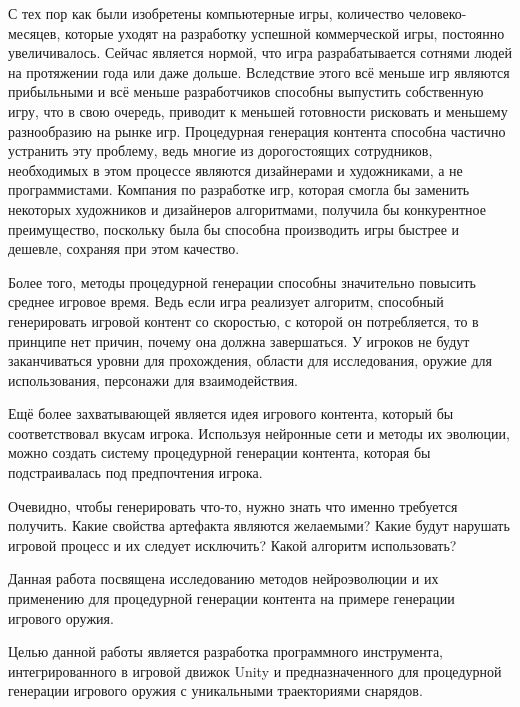 ﻿%

С тех пор как были изобретены компьютерные игры, количество человеко-месяцев, которые уходят на разработку успешной коммерческой игры, постоянно увеличивалось. Сейчас является нормой, что игра разрабатывается сотнями людей на протяжении года или даже дольше. Вследствие этого всё меньше игр являются прибыльными и всё меньше разработчиков способны выпустить собственную игру, что в свою очередь, приводит к меньшей готовности рисковать и меньшему разнообразию на рынке игр. Процедурная генерация контента способна частично устранить эту проблему, ведь многие из дорогостоящих сотрудников, необходимых в этом процессе являются дизайнерами и художниками, а не программистами. Компания по разработке игр, которая смогла бы заменить некоторых художников и дизайнеров алгоритмами, получила бы конкурентное преимущество, поскольку была бы способна производить игры быстрее и дешевле, сохраняя при этом качество.

Более того, методы процедурной генерации способны значительно повысить среднее игровое время. Ведь если игра реализует алгоритм, способный генерировать игровой контент со скоростью, с которой он потребляется, то в принципе нет причин, почему она должна завершаться. У игроков не будут заканчиваться уровни для прохождения, области для исследования, оружие для использования, персонажи для взаимодействия.

Ещё более захватывающей является идея игрового контента, который бы соответствовал вкусам игрока. Используя нейронные сети и методы их эволюции, можно создать систему процедурной генерации контента, которая бы подстраивалась под предпочтения игрока. 

Очевидно, чтобы генерировать что-то, нужно знать что именно требуется получить. Какие свойства артефакта являются желаемыми? Какие будут нарушать игровой процесс и их следует исключить? Какой алгоритм использовать?

Данная работа посвящена исследованию методов нейроэволюции и их применению для процедурной генерации контента на примере генерации игрового оружия.

\pagebreak


Целью данной работы является разработка программного инструмента, интегрированного в игровой движок Unity и предназначенного для процедурной генерации игрового оружия с уникальными траекториями снарядов.

